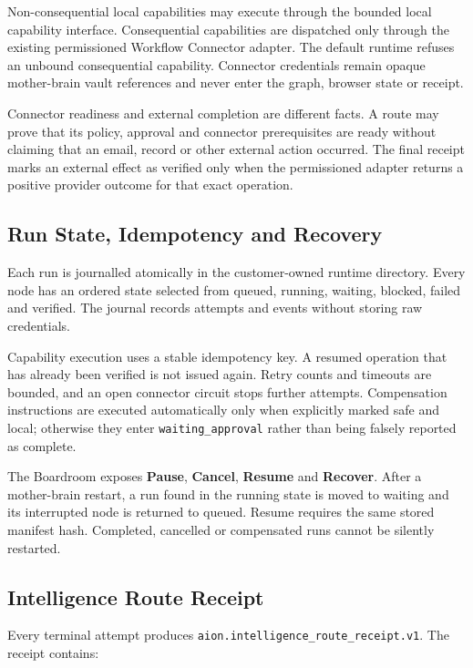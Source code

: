 Non-consequential local capabilities may execute through the bounded local capability interface.
Consequential capabilities are dispatched only through the existing permissioned Workflow Connector
adapter.  The default runtime refuses an unbound consequential capability.  Connector credentials
remain opaque mother-brain vault references and never enter the graph, browser state or receipt.

Connector readiness and external completion are different facts.  A route may prove that its policy,
approval and connector prerequisites are ready without claiming that an email, record or other
external action occurred.  The final receipt marks an external effect as verified only when the
permissioned adapter returns a positive provider outcome for that exact operation.

\subsection{Run State, Idempotency and Recovery}

Each run is journalled atomically in the customer-owned runtime directory.  Every node has an ordered
state selected from queued, running, waiting, blocked, failed and verified.  The journal records
attempts and events without storing raw credentials.

Capability execution uses a stable idempotency key.  A resumed operation that has already been
verified is not issued again.  Retry counts and timeouts are bounded, and an open connector circuit
stops further attempts.  Compensation instructions are executed automatically only when explicitly
marked safe and local; otherwise they enter \texttt{waiting\_approval} rather than being falsely
reported as complete.

The Boardroom exposes \textbf{Pause}, \textbf{Cancel}, \textbf{Resume} and \textbf{Recover}.  After a
mother-brain restart, a run found in the running state is moved to waiting and its interrupted node is
returned to queued.  Resume requires the same stored manifest hash.  Completed, cancelled or
compensated runs cannot be silently restarted.

\subsection{Intelligence Route Receipt}

Every terminal attempt produces \texttt{aion.intelligence\_route\_receipt.v1}.  The receipt contains:

